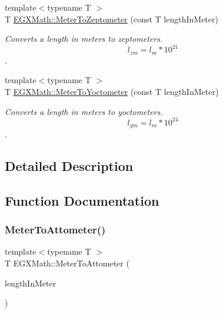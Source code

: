 \begin{DoxyCompactItemize}
{\footnotesize template$<$typename T $>$ }\\T \mbox{\hyperlink{group___e_g_x_math-_conversions-_length_conversions-_s_i-_meter-_s_i_ga865c00bc3abce82de30d18022f460a5c}{E\+G\+X\+Math\+::\+Meter\+To\+Zeptometer}} (const T length\+In\+Meter)
\begin{DoxyCompactList}\small\item\em Converts a length in meters to zeptometers. \[ l_{zm}=l_{m} * 10^{21} \]. \end{DoxyCompactList}\item 
{\footnotesize template$<$typename T $>$ }\\T \mbox{\hyperlink{group___e_g_x_math-_conversions-_length_conversions-_s_i-_meter-_s_i_ga0a9af3add4234d53c0ea30906ead1c3a}{E\+G\+X\+Math\+::\+Meter\+To\+Yoctometer}} (const T length\+In\+Meter)
\begin{DoxyCompactList}\small\item\em Converts a length in meters to yoctometers. \[ l_{ym}=l_{m} * 10^{24} \]. \end{DoxyCompactList}\end{DoxyCompactItemize}


\subsection{Detailed Description}


\subsection{Function Documentation}
\mbox{\label{group___e_g_x_math-_conversions-_length_conversions-_s_i-_meter-_s_i_ga7c27a5231b96b904786f519e8bad257c}} 
\subsubsection{\texorpdfstring{Meter\+To\+Attometer()}{MeterToAttometer()}}
{\footnotesize\ttfamily template$<$typename T $>$ \\
T E\+G\+X\+Math\+::\+Meter\+To\+Attometer (\begin{DoxyParamCaption}\item[{const T}]{length\+In\+Meter }\end{DoxyParamCaption})}



